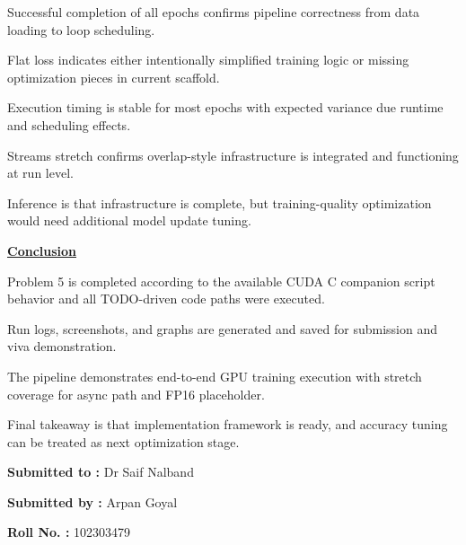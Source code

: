\documentclass[12pt]{article}
\begin{document}
Successful completion of all epochs confirms pipeline correctness from data loading to loop scheduling.

Flat loss indicates either intentionally simplified training logic or missing optimization pieces in current scaffold.

Execution timing is stable for most epochs with expected variance due runtime and scheduling effects.

Streams stretch confirms overlap-style infrastructure is integrated and functioning at run level.

Inference is that infrastructure is complete, but training-quality optimization would need additional model update tuning.

\vspace{0.8cm}

\textbf{\Large \underline{Conclusion}}

\vspace{0.5cm}

Problem 5 is completed according to the available CUDA C companion script behavior and all TODO-driven code paths were executed.

Run logs, screenshots, and graphs are generated and saved for submission and viva demonstration.

The pipeline demonstrates end-to-end GPU training execution with stretch coverage for async path and FP16 placeholder.

Final takeaway is that implementation framework is ready, and accuracy tuning can be treated as next optimization stage.

\newpage

\noindent


\vspace{0.7cm}

\begin{center}
\end{center}

\vspace{1cm}

\textbf{Submitted to :} Dr Saif Nalband

\textbf{Submitted by :} Arpan Goyal

\textbf{Roll No. :} 102303479
\end{document}
